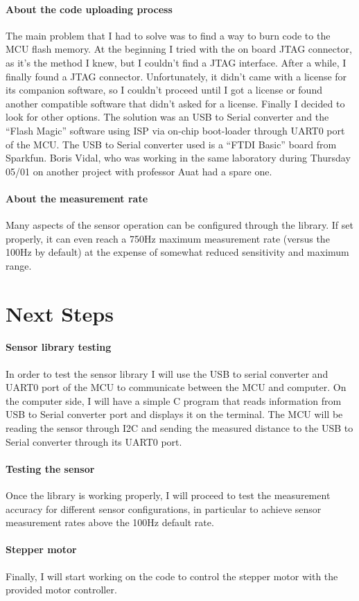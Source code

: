 \documentclass{article}
\begin{document}
\paragraph{About the code uploading process}
The main problem that I had to solve was to find a way to burn code to the MCU flash memory. 
At the beginning I tried with the on board JTAG connector, as it’s the method I knew, but I couldn’t find a JTAG interface. 
After a while, I finally found a JTAG connector.
Unfortunately, it didn’t came with a license for its companion software, so I couldn’t proceed until I got a license or found another compatible software that didn’t asked for a license. 
Finally I decided to look for other options. 
The solution was an USB to Serial converter and the “Flash Magic” software using ISP via on-chip boot-loader through UART0 port of the MCU. 
The USB to Serial converter used is a “FTDI Basic” board from Sparkfun. 
Boris Vidal, who was working in the same laboratory during Thursday 05/01 on another project with professor Auat had a spare one.
\paragraph{About the measurement rate}
Many aspects of the sensor operation can be configured through the library. 
If set properly, it can even reach a 750Hz maximum measurement rate (versus the 100Hz by default) at the expense of somewhat reduced sensitivity and maximum range. 
\section{Next Steps}
\paragraph{Sensor library testing}
In order to test the sensor library I will use the USB to serial converter and UART0 port of the MCU to communicate between the MCU and computer. 
On the computer side, I will have a simple C program that reads information from USB to Serial converter port and displays it on the terminal. 
The MCU will be reading the sensor through I2C and sending the measured distance to the USB to Serial converter through its UART0 port. 
\paragraph{Testing the sensor}
Once the library is working properly, I will proceed to test the measurement accuracy for different sensor configurations, in particular to achieve sensor measurement rates above the 100Hz default rate.
\paragraph{Stepper motor}
Finally, I will start working on the code to control the stepper motor with the provided motor controller.
\end{document}
